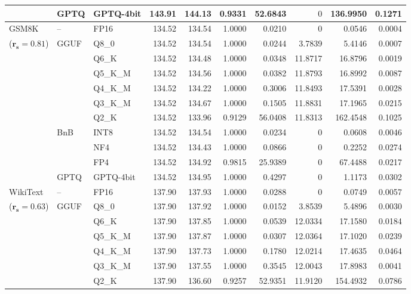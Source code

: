 \begin{longtable}{ll l rrrrrrr}
 & GPTQ & GPTQ-4bit & 143.91 & 144.13 & \cellcolor{red!18} 0.9331 & \cellcolor{red!18} 52.6843 & \cellcolor{cyan!12} $0$ & \cellcolor{red!18} 136.9950 & \cellcolor{red!18} 0.1271 \\
\midrule
GSM8K & -- & FP16 & 134.52 & 134.54 & 1.0000 & 0.0210 & \cellcolor{cyan!12} $0$ & 0.0546 & 0.0004 \\
{\small ($\mathbf{r_s{=}0.81}$)} & GGUF & Q8\_0 & 134.52 & 134.54 & 1.0000 & 0.0244 & 3.7839 & 5.4146 & 0.0007 \\
 &  & Q6\_K & 134.52 & 134.48 & 1.0000 & 0.0348 & 11.8717 & 16.8796 & 0.0019 \\
 &  & Q5\_K\_M & 134.52 & 134.56 & 1.0000 & 0.0382 & 11.8793 & 16.8992 & 0.0087 \\
 &  & Q4\_K\_M & 134.52 & 134.22 & 1.0000 & 0.3006 & 11.8493 & 17.5391 & 0.0028 \\
 &  & Q3\_K\_M & 134.52 & 134.67 & 1.0000 & 0.1505 & 11.8831 & 17.1965 & 0.0215 \\
 &  & Q2\_K & 134.52 & 133.96 & \cellcolor{red!18} 0.9129 & \cellcolor{red!18} 56.0408 & 11.8313 & \cellcolor{red!18} 162.4548 & \cellcolor{red!18} 0.1025 \\
 & BnB & INT8 & 134.52 & 134.54 & 1.0000 & 0.0234 & \cellcolor{cyan!12} $0$ & 0.0608 & 0.0046 \\
 &  & NF4 & 134.52 & 134.43 & 1.0000 & 0.0866 & \cellcolor{cyan!12} $0$ & 0.2252 & 0.0274 \\
 &  & FP4 & 134.52 & 134.92 & 0.9815 & 25.9389 & \cellcolor{cyan!12} $0$ & 67.4488 & 0.0217 \\
 & GPTQ & GPTQ-4bit & 134.52 & 134.95 & 1.0000 & 0.4297 & \cellcolor{cyan!12} $0$ & 1.1173 & 0.0302 \\
\midrule
WikiText & -- & FP16 & 137.90 & 137.93 & 1.0000 & 0.0288 & \cellcolor{cyan!12} $0$ & 0.0749 & 0.0057 \\
{\small ($\mathbf{r_s{=}0.63}$)} & GGUF & Q8\_0 & 137.90 & 137.92 & 1.0000 & 0.0152 & 3.8539 & 5.4896 & 0.0030 \\
 &  & Q6\_K & 137.90 & 137.85 & 1.0000 & 0.0539 & 12.0334 & 17.1580 & 0.0184 \\
 &  & Q5\_K\_M & 137.90 & 137.87 & 1.0000 & 0.0307 & 12.0364 & 17.1020 & 0.0239 \\
 &  & Q4\_K\_M & 137.90 & 137.73 & 1.0000 & 0.1780 & 12.0214 & 17.4635 & 0.0464 \\
 &  & Q3\_K\_M & 137.90 & 137.55 & 1.0000 & 0.3545 & 12.0043 & 17.8983 & 0.0041 \\
 &  & Q2\_K & 137.90 & 136.60 & \cellcolor{red!18} 0.9257 & \cellcolor{red!18} 52.9351 & 11.9120 & \cellcolor{red!18} 154.4932 & \cellcolor{red!18} 0.0786 \\

\end{longtable}
